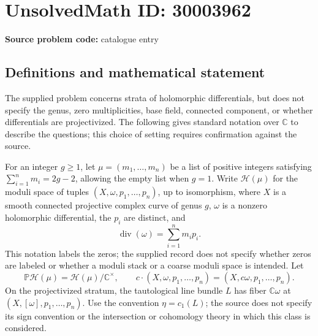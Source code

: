 \documentclass[11pt]{article}
\newcommand{\C}{\mathbb{C}}
\begin{document}
\section*{UnsolvedMath ID: 30003962}
\textbf{Source problem code:} catalogue entry
\subsection{Definitions and mathematical statement}
The supplied problem concerns strata of holomorphic differentials, but does not specify the genus, zero multiplicities, base field, connected component, or whether differentials are projectivized. The following gives standard notation over \(\C\) to describe the questions; this choice of setting requires confirmation against the source.

For an integer \(g\geq 1\), let \(\mu=(m_1,\ldots,m_n)\) be a list of positive integers satisfying \(\sum_{i=1}^n m_i=2g-2\), allowing the empty list when \(g=1\). Write \(\mathcal H(\mu)\) for the moduli space of tuples \((X,\omega,p_1,\ldots,p_n)\), up to isomorphism, where \(X\) is a smooth connected projective complex curve of genus \(g\), \(\omega\) is a nonzero holomorphic differential, the \(p_i\) are distinct, and
\[
\operatorname{div}(\omega)=\sum_{i=1}^n m_i p_i.
\]
This notation labels the zeros; the supplied record does not specify whether zeros are labeled or whether a moduli stack or a coarse moduli space is intended. Let
\[
\mathbb P\mathcal H(\mu)=\mathcal H(\mu)/\C^{\times},
\qquad c\cdot(X,\omega,p_1,\ldots,p_n)=(X,c\omega,p_1,\ldots,p_n).
\]
On the projectivized stratum, the tautological line bundle \(L\) has fiber \(\C\omega\) at \((X,[\omega],p_1,\ldots,p_n)\). Use the convention \(\eta=c_1(L)\); the source does not specify its sign convention or the intersection or cohomology theory in which this class is considered.
\end{document}
